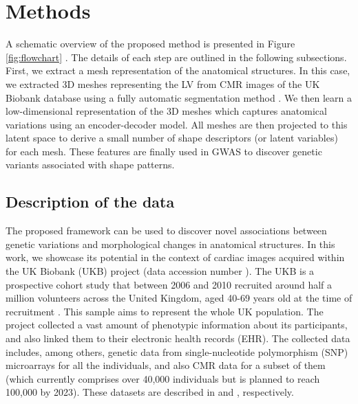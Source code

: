 \section{Methods}
 A schematic overview of the proposed method is presented in Figure \ref{fig:flowchart} . The details of each step are outlined in the following subsections. First, we extract a mesh representation of the anatomical structures. In this case, we extracted 3D meshes representing the LV from CMR images of the UK Biobank database using a fully automatic segmentation method \cite{ref_rahman}. We then learn a low-dimensional representation of the 3D meshes which captures anatomical variations using an encoder-decoder model. All meshes are then projected to this latent space to derive a small number of shape descriptors (or latent variables) for each mesh. These features are finally used in GWAS to discover genetic variants associated with shape patterns. 

\subsection{Description of the data}
The proposed framework can be used to discover novel associations between genetic variations and morphological changes in anatomical structures. In this work, we showcase its potential in the context of cardiac images acquired within the UK Biobank (UKB) project (data accession number \ACCESSIONNUMBER). The UKB is a prospective cohort study that between 2006 and 2010 recruited around half a million volunteers across the United Kingdom, aged 40-69 years old at the time of recruitment \cite{ref_ukbb}. This sample aims to represent the whole UK population. The project collected a vast amount of phenotypic information about its participants, and also linked them to their electronic health records (EHR). The collected data includes, among others, genetic data from single-nucleotide polymorphism (SNP) microarrays for all the individuals, and also CMR data for a subset of them (which currently comprises over 40,000 individuals but is planned to reach 100,000 by 2023). These datasets are described in \cite{ref_ukbb_genetics} and \cite{ref_ukbb_cmr}, respectively.

